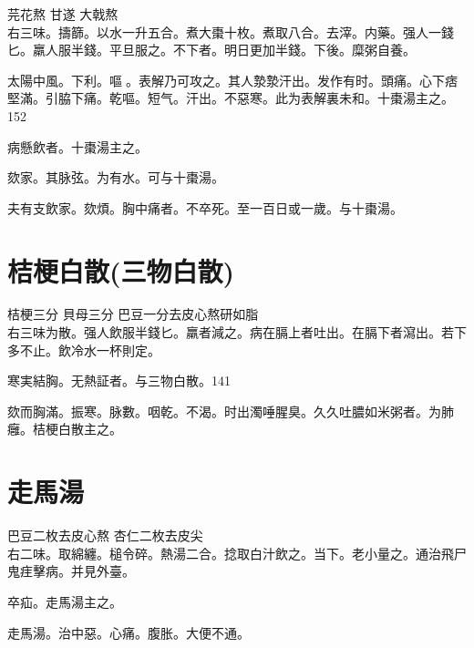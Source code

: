 芫花{\scriptsize 熬} 甘遂{ }大戟{\scriptsize 熬}\\
右三味。擣篩。以水一升五合。煮大棗十枚。煮取八合。去滓。内藥。强人一錢匕。羸人服半錢。平旦服之。不下者。明日更加半錢。下後。糜粥自養。

太陽中風。下利。嘔{\sungtpii 𠱘}。表解乃可攻之。其人漐漐汗出。发作有时。頭痛。心下痞堅滿。引脇下痛。乾嘔。短气。汗出。不惡寒。此为表解裏未和。十棗湯主之。152

病懸飲者。十棗湯主之。

欬家。其脉弦。为有水。可与十棗湯。

夫有支飲家。欬煩。胸中痛者。不卒死。至一百日{\khaaitp 或}一歲。与十棗湯。

\section{桔梗白散(三物白散)}

桔梗{\scriptsize 三分} 貝母{\scriptsize 三分} 巴豆{\scriptsize 一分去皮心熬研如脂}\\
右三味为散。强人飲服半錢匕。羸者減之。病在膈上者吐出。在膈下者瀉出。若下多不止。飲冷水一杯則定。

寒実結胸。无熱証者。与三物白散。141

欬而胸滿。振寒。脉數。咽乾。不渴。时出濁唾腥臭。久久吐膿如米粥者。为肺癰。桔梗白散主之。

\section{走馬湯}

巴豆{\scriptsize 二枚去皮心熬} 杏仁{\scriptsize 二枚{\khaaitp 去皮尖}}\\
右二味。取綿纏。槌令碎。熱湯二合。捻取白汁飲之。当下。老小量之。通治飛尸鬼{\khaaitp 疰}擊病。{\scriptsize {\khaaitp 并見外臺。}}

卒疝。走馬湯主之。{\wuben}

走馬湯。治中惡。心痛。腹胀。大便不通。{\dengben}




